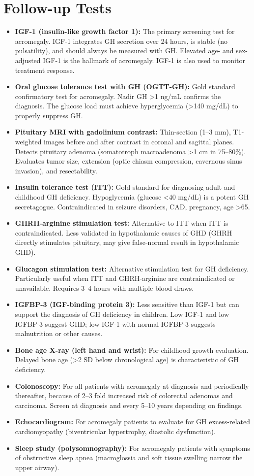 \section*{Follow-up Tests}
\begin{itemize}
  \item \textbf{IGF-1 (insulin-like growth factor 1):} The primary screening test for acromegaly. IGF-1 integrates GH secretion over 24 hours, is stable (no pulsatility), and should always be measured with GH. Elevated age- and sex-adjusted IGF-1 is the hallmark of acromegaly. IGF-1 is also used to monitor treatment response.
  \item \textbf{Oral glucose tolerance test with GH (OGTT-GH):} Gold standard confirmatory test for acromegaly. Nadir GH >1 ng/mL confirms the diagnosis. The glucose load must achieve hyperglycemia (>140 mg/dL) to properly suppress GH.
  \item \textbf{Pituitary MRI with gadolinium contrast:} Thin-section (1--3 mm), T1-weighted images before and after contrast in coronal and sagittal planes. Detects pituitary adenoma (somatotroph macroadenoma >1 cm in 75--80\%). Evaluates tumor size, extension (optic chiasm compression, cavernous sinus invasion), and resectability.
  \item \textbf{Insulin tolerance test (ITT):} Gold standard for diagnosing adult and childhood GH deficiency. Hypoglycemia (glucose <40 mg/dL) is a potent GH secretagogue. Contraindicated in seizure disorders, CAD, pregnancy, age >65.
  \item \textbf{GHRH-arginine stimulation test:} Alternative to ITT when ITT is contraindicated. Less validated in hypothalamic causes of GHD (GHRH directly stimulates pituitary, may give false-normal result in hypothalamic GHD).
  \item \textbf{Glucagon stimulation test:} Alternative stimulation test for GH deficiency. Particularly useful when ITT and GHRH-arginine are contraindicated or unavailable. Requires 3--4 hours with multiple blood draws.
  \item \textbf{IGFBP-3 (IGF-binding protein 3):} Less sensitive than IGF-1 but can support the diagnosis of GH deficiency in children. Low IGF-1 and low IGFBP-3 suggest GHD; low IGF-1 with normal IGFBP-3 suggests malnutrition or other causes.
  \item \textbf{Bone age X-ray (left hand and wrist):} For childhood growth evaluation. Delayed bone age (>2 SD below chronological age) is characteristic of GH deficiency.
  \item \textbf{Colonoscopy:} For all patients with acromegaly at diagnosis and periodically thereafter, because of 2--3 fold increased risk of colorectal adenomas and carcinoma. Screen at diagnosis and every 5--10 years depending on findings.
  \item \textbf{Echocardiogram:} For acromegaly patients to evaluate for GH excess-related cardiomyopathy (biventricular hypertrophy, diastolic dysfunction).
  \item \textbf{Sleep study (polysomnography):} For acromegaly patients with symptoms of obstructive sleep apnea (macroglossia and soft tissue swelling narrow the upper airway).
\end{itemize}

